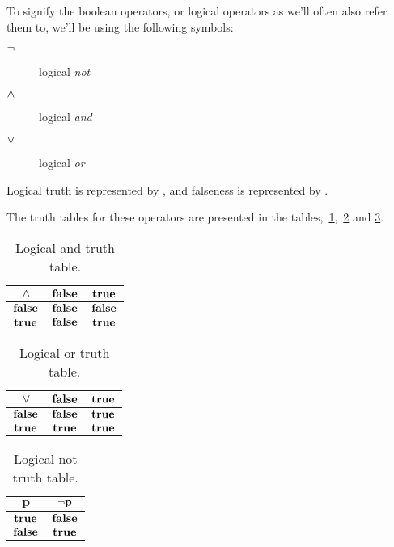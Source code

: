 To signify the boolean operators, or logical operators as we'll often
also refer them to, we'll be using the following symbols:

\begin{description}
\item[$\neg$] logical \textit{not}
\item[$\wedge$] logical \textit{and}
\item[$\vee$] logical \textit{or}
\end{description}

Logical truth is represented by \True, and falseness is represented by
\False.

The truth tables for these operators are presented in the
tables,~\ref{tab:log-and-table},~\ref{tab:log-or-table} and
\ref{tab:log-not-table}.

\begin{table}
  \centering
    \begin{tabular}{|c|c|c|}
      \hline
      $\mathbf{\wedge}$ & $\mathbf{\textbf{false}}$ & $\mathbf{\textbf{true}}$ \\ \hline
      $\mathbf{\textbf{false}}$ & $\mathbf{\textbf{false}}$ & $\mathbf{\textbf{false}}$ \\ \hline
      $\mathbf{\textbf{true}}$ & $\mathbf{\textbf{false}}$ & $\mathbf{\textbf{true}}$ \\ \hline
    \end{tabular}
  \caption{Logical and truth table.}
  \label{tab:log-and-table}
\end{table}

\begin{table}
  \centering
    \begin{tabular}{|c|c|c|}
      \hline
      $\mathbf{\vee}$ & $\mathbf{\textbf{false}}$ & $\mathbf{\textbf{true}}$ \\ \hline
      $\mathbf{\textbf{false}}$ & $\textbf{false}$ & $\textbf{true}$ \\ \hline
      $\mathbf{\textbf{true}}$ & $\textbf{true}$ & $\textbf{true}$ \\ \hline
    \end{tabular}
  \caption{Logical or truth table.}
  \label{tab:log-or-table}
\end{table}

\begin{table}
  \centering
    \begin{tabular}{|c|c|}
      \hline
      $\mathbf{p}$ & $\mathbf{\neg p}$ \\ \hline
      $\textbf{true}$ & $\textbf{false}$ \\ \hline
      $\textbf{false}$ & $\textbf{true}$ \\ \hline
    \end{tabular}
  \caption{Logical not truth table.}
  \label{tab:log-not-table}
\end{table}

